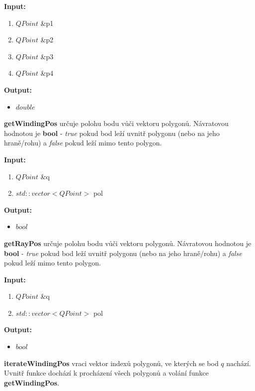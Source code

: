 \documentclass{article}
\begin{document}
\textbf{Input:}
\begin{enumerate} 
\item $QPoint$ \&p1
\item $QPoint$ \&p2
\item $QPoint$ \&p3
\item $QPoint$ \&p4
\end{enumerate}

\bigskip 
\textbf{Output:}
\begin{itemize} 
\item $double$
\end{itemize}

\bigskip 
\textbf{getWindingPos} určuje polohu bodu vůči vektoru polygonů. Návratovou hodnotou je  \textbf{bool} - \textit{true} pokud bod leží uvnitř polygonu (nebo na jeho hraně/rohu) a \textit{false} pokud leží mimo tento polygon.

\bigskip 


\textbf{Input:}
\begin{enumerate} 
\item $QPoint$ \&q
\item $std::vector<QPoint>$ pol
\end{enumerate}

\bigskip 
\textbf{Output:}
\begin{itemize} 
\item $bool$
\end{itemize}

\bigskip 

\textbf{getRayPos} určuje polohu bodu vůči vektoru polygonů. Návratovou hodnotou je  \textbf{bool} - \textit{true} pokud bod leží uvnitř polygonu (nebo na jeho hraně/rohu) a \textit{false} pokud leží mimo tento polygon.

\bigskip 

 \textbf{Input:}
\begin{enumerate} 
\item $QPoint$ \&q
\item $std::vector<QPoint>$ pol
\end{enumerate}

\bigskip 
\textbf{Output:}
\begin{itemize} 
\item $bool$
\end{itemize}



\bigskip 

\textbf{iterateWindingPos} vraci vektor indexů polygonů, ve kterých se bod $q$ nachází. Uvnitř funkce dochází k procházení všech polygonů a volání funkce \textbf{getWindingPos}.
 \\ 
\end{document}
